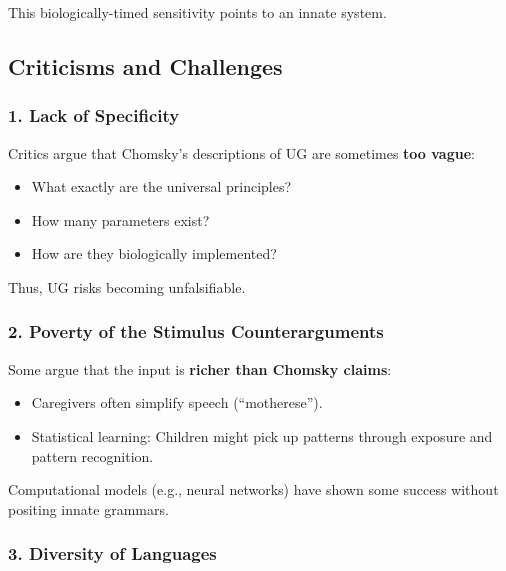 \documentclass[12pt]{article}
\newcommand{\tightlist}{\itemsep 0pt\parskip 0pt\parsep 0pt}
\begin{document}
This biologically-timed sensitivity points to an innate system.

\hypertarget{criticisms-and-challenges}{%
\subsection{Criticisms and Challenges}\label{criticisms-and-challenges}}

\hypertarget{lack-of-specificity}{%
\subsubsection{1. Lack of Specificity}\label{lack-of-specificity}}

Critics argue that Chomsky's descriptions of UG are sometimes
\textbf{too vague}:

\begin{itemize}
\tightlist
\item
  What exactly are the universal principles?
\item
  How many parameters exist?
\item
  How are they biologically implemented?
\end{itemize}

Thus, UG risks becoming unfalsifiable.

\hypertarget{poverty-of-the-stimulus-counterarguments}{%
\subsubsection{2. Poverty of the Stimulus
Counterarguments}\label{poverty-of-the-stimulus-counterarguments}}

Some argue that the input is \textbf{richer than Chomsky claims}:

\begin{itemize}
\tightlist
\item
  Caregivers often simplify speech (``motherese'').
\item
  Statistical learning: Children might pick up patterns through exposure
  and pattern recognition.
\end{itemize}

Computational models (e.g., neural networks) have shown some success
without positing innate grammars.

\hypertarget{diversity-of-languages}{%
\subsubsection{3. Diversity of Languages}\label{diversity-of-languages}}
\end{document}
